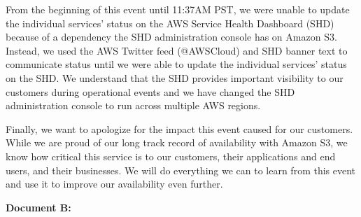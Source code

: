 \documentclass{report}
\begin{document}
\begin{spacing}{1.4}
\begin{enumerate}[leftmargin=*]

      From the beginning of this event until 11:37AM PST, we were unable to update the individual services’ status on the AWS Service Health Dashboard (SHD) because of a dependency the SHD administration console has on Amazon S3. Instead, we used the AWS Twitter feed (@AWSCloud) and SHD banner text to communicate status until we were able to update the individual services’ status on the SHD.  We understand that the SHD provides important visibility to our customers during operational events and we have changed the SHD administration console to run across multiple AWS regions.

      Finally, we want to apologize for the impact this event caused for our customers. While we are proud of our long track record of availability with Amazon S3, we know how critical this service is to our customers, their applications and end users, and their businesses. We will do everything we can to learn from this event and use it to improve our availability even further.~
    
    
    \newpage

    \textbf{Document B:}
    


\end{enumerate}
\end{spacing}
\end{document}

